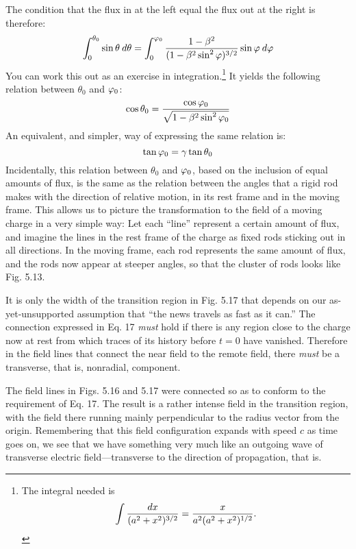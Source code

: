 The condition that the flux in at the left equal the flux out at the
right is therefore:
\begin{equation}
  \int_0^{\theta_0} \sin\theta\:d\theta
      = \int_0^{\varphi_0} \frac{1-\beta^2}{(1-\beta^2\sin^2\varphi)^{3/2}} \sin\varphi\:d\varphi
\end{equation}
You can work this out as an exercise in integration.\footnote{The integral needed is
\begin{equation*}
  \int \frac{d x}{(a^2+x^2)^{3/2}} = \frac{x}{a^2(a^2+x^2)^{1/2}} .
\end{equation*}
} It yields the following relation between $\theta_0$ and $\varphi_0$:
\begin{equation}
  \cos\theta_0 = \frac{\cos\varphi_0}{\sqrt{1-\beta^2\sin^2\varphi_0}}
\end{equation}
An equivalent, and simpler, way of expressing the same relation is:
\begin{equation}
  \tan\varphi_0 = \gamma\tan\theta_0
\end{equation}
Incidentally, this relation between $\theta_0$ and $\varphi_0$, based on the inclusion
of equal amounts of flux, is the same as the relation between the
angles that a rigid rod makes with the direction of relative motion,
in its rest frame and in the moving frame. This allows us to picture
the transformation to the field of a moving charge in a very simple
way: Let each ``line'' represent a certain amount of flux, and imagine
the lines in the rest frame of the charge as fixed rods sticking out in
all directions. In the moving frame, each rod represents the same
amount of flux, and the rods now appear at steeper angles, so that
the cluster of rods looks like Fig. 5.13.

It is only the width of the transition region in Fig. 5.17 that depends
on our as-yet-unsupported assumption that ``the news travels
as fast as it can.'' The connection expressed in Eq. 17 \emph{must} hold if
there is any region close to the charge now at rest from which traces
of its history before $t = 0$ have vanished. Therefore in the field lines
that connect the near field to the remote field, there \emph{must} be a transverse,
that is, nonradial, component.

The field lines in Figs. 5.16 and 5.17 were connected so as to conform
to the requirement of Eq. 17. The result is a rather intense
field in the transition region, with the field there running mainly perpendicular
to the radius vector from the origin. Remembering that
this field configuration expands with speed $c$ as time goes on, we see
that we have something very much like an outgoing wave of transverse
electric field---transverse to the direction of propagation, that is.

